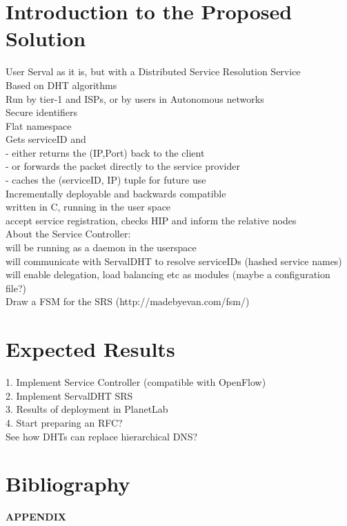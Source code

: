 \documentclass[12pt,a4paper,oneside]{article}
\begin{document}
\newpage
\section{Introduction to the Proposed Solution}
User Serval as it is, but with a Distributed Service Resolution Service
\\Based on DHT algorithms
\\Run by tier-1 and ISPs, or by users in Autonomous networks
\\Secure identifiers
\\Flat namespace
\\Gets serviceID and
\\- either returns the (IP,Port) back to the client
\\- or forwards the packet directly to the service provider
\\- caches the (serviceID, IP) tuple for future use
\\Incrementally deployable and backwards compatible
\\written in C, running in the user space
\\accept service registration, checks HIP and inform the relative nodes
\\About the Service Controller:
\\will be running as a daemon in the userspace
\\will communicate with ServalDHT to resolve serviceIDs (hashed service names)
\\will enable delegation, load balancing etc as modules (maybe a configuration file?)
\\Draw a FSM for the SRS (http://madebyevan.com/fsm/)



\newpage
\section{Expected Results}
1. Implement Service Controller (compatible with OpenFlow)
\\2. Implement ServalDHT SRS
\\3. Results of deployment in PlanetLab
\\4. Start preparing an RFC?
\\See how DHTs can replace hierarchical DNS?


\newpage
\section{Bibliography}
\nocite{*}

\renewcommand{\refname}{}


\newpage
\thispagestyle{empty}
{\Huge \bf APPENDIX}
\newpage
\end{document}
